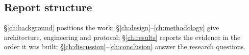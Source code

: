 \subsection{Report structure}\label{sec:intro-structure}
\S\ref{ch:background} positions the work; \S\ref{ch:design}--\ref{ch:methodology}
give architecture, engineering and protocol; \S\ref{ch:results} reports the
evidence in the order it was built; \S\ref{ch:discussion}--\ref{ch:conclusion}
answer the research questions.

